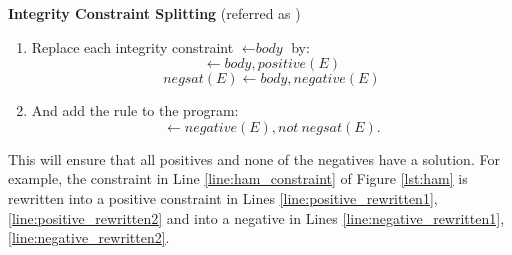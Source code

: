 \vspace{3pt}
\textbf{Integrity Constraint Splitting} 
(referred as \metac)
\begin{enumerate}
  \item Replace each integrity constraint $\leftarrow \textit{body}$ by: 
$$\leftarrow \textit{body}, \textit{positive}(E) $$
$$\textit{negsat}(E) \leftarrow \textit{body}, \textit{negative}(E) $$
\item
And add the rule to the program:
$$ \leftarrow \textit{negative}(E), \textit{not} ~ \textit{negsat}(E).$$ 
\end{enumerate}
This will ensure that all positives and none of the negatives have a solution. For example, the constraint in Line \ref{line:ham_constraint} of Figure \ref{lst:ham} is rewritten into a positive constraint in Lines \ref{line:positive_rewritten1}, \ref{line:positive_rewritten2} and into a negative in Lines \ref{line:negative_rewritten1}, \ref{line:negative_rewritten2}.


